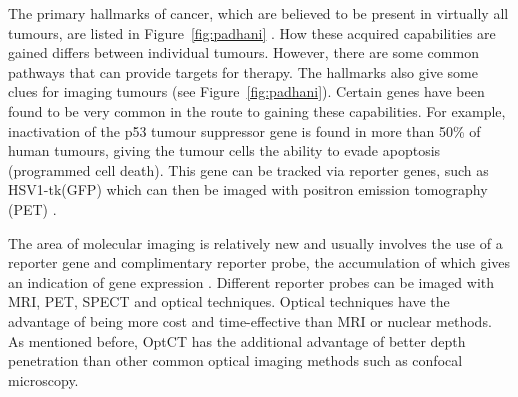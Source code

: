 \documentclass[12pt]{article}
\begin{document}




The primary hallmarks of cancer, which are believed to be present in virtually all tumours, are listed in Figure~\ref{fig:padhani} \cite{Hanahan:2000}. How these acquired capabilities are gained differs between individual tumours. However, there are some common pathways that can provide targets for therapy. The hallmarks also give some clues for imaging tumours (see Figure~\ref{fig:padhani}). Certain genes have been found to be very common in the route to gaining these capabilities. For example, inactivation of the p53 tumour suppressor gene is found in more than 50\% of  human tumours, giving the tumour cells the ability to evade apoptosis (programmed cell death). This gene can be tracked via reporter genes, such as HSV1-tk(GFP) which can then be imaged with positron emission tomography (PET) \cite{Doubrovin:2001}.  

The area of molecular imaging is relatively new and usually involves the use of a reporter gene and complimentary reporter probe, the accumulation of which gives an indication of gene expression \cite{Blasberg:2003}. Different reporter probes can be imaged with MRI, PET, SPECT and optical techniques. Optical techniques have the advantage of being more cost and time-effective than MRI or nuclear methods. As mentioned before, OptCT has the additional advantage of better depth penetration than other common optical imaging methods such as confocal microscopy.
\end{document}
